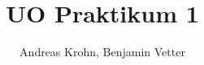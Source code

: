 \documentclass{scrreprt}
\begin{document}
\title{UO Praktikum 1}

\author{Andreas Krohn, Benjamin Vetter}

\maketitle
\end{document}
